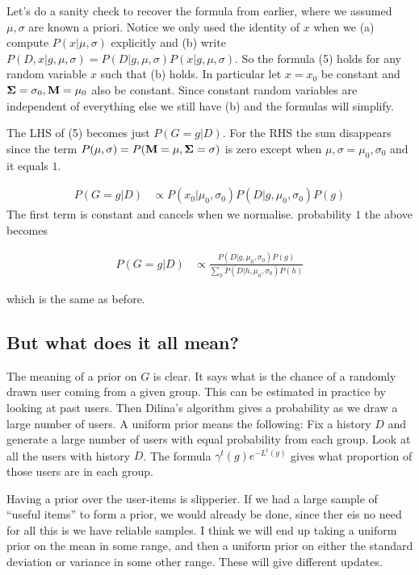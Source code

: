 \documentclass[12pt]{article}
\theoremstyle{definition}
\newcommand{\si}{\ensuremath{\sigma}}
\newcommand{\G}{\ensuremath{\gamma}}
\newcommand{\0}{\ensuremath{\varnothing}}
\newcommand{\MM}{{\bf M}}
\newcommand{\SSS}{{\bf \Sigma}}
\newcommand{\1}{{\bf 1}}
\begin{document}
  Let's do a sanity check to recover the formula from earlier, where we assumed $ \mu, \si$ are known a priori. Notice we only used the identity of  $x$ when we (a) compute $P(x| \mu, \si)$ explicitly and (b) write $P(D,x|  g,       \mu,    \si  ) = P(D|  g,     \mu,  \si  )P(x|  g,       \mu,    \si  )$.  So the formula (5) holds for any random variable $x$ such that (b) holds. In particular let $x =x_0$ be constant  and $\SSS = \si_0, \MM = \mu_0$ also be constant.  Since constant random variables are independent of everything else we still have (b) and the formulas will simplify.
  
  The LHS of (5) becomes just $P(G=g|D)$. For the RHS the sum disappears since the term $P(\mu, \si) = P(\MM = \mu, \SSS = \si)$ is zero except when $\mu,\si = \mu_0,\si_0$ and it equals $1$. 
  
  
  
  \begin{align}
   P(G=g| D ) &\propto   P( x_0|        \mu_0,    \si _0 ) P(D |  g,       \mu_0,    \si_0  )    P(g)   
  \end{align}
  The first term is constant and cancels when we normalise.   probability $1$ the above becomes
  
  \begin{align}
    P(G=g| D ) &\propto  \frac{ P(D |  g,       \mu_0,    \si_0  )    P(g)   }{ \sum_h P(D |  h,       \mu_0,    \si_0  )    P(h) }
  \end{align}
  
  which is the same as before.
  
  \subsection{But what does it all mean?}
  
  The meaning of a prior on $G$ is clear. It says what is the chance of a randomly drawn user coming from a given group. This can be estimated in practice by looking at past users. Then Dilina's algorithm gives a probability as we draw a large number of users. A uniform prior means the following: Fix a history $D$ and generate a large number of users with equal probability from each group. Look at all the users with history $D$.  The formula $\G^{t}(g)e^{-L^t(g)}$ gives   what proportion of those users are in each group. 
  
  Having a prior over the user-items is slipperier. If we had a large sample of ``useful items'' to form a prior, we would already be done, since ther eis no need for all this is we have reliable samples. I think we will end up taking a uniform prior on the mean in some range, and then a uniform prior on either the standard deviation or variance in some other range. These will give different updates.
  
\end{document}
